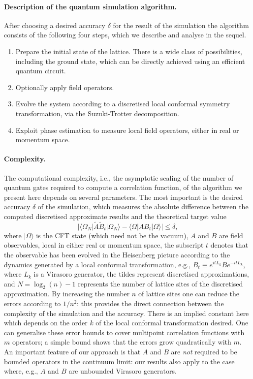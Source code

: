 \documentclass[12pt]{article}
\newcommand{\1}{\mathds{1}}
\begin{document}
\paragraph*{Description of the quantum simulation algorithm.}
After choosing a desired accuracy $\delta$ for the result of the simulation the algorithm consists of the following four steps, which we describe and analyse in the sequel.
\begin{enumerate}
  \item Prepare the initial state of the lattice. There is a wide class of possibilities, including the ground state, which can be directly achieved using an efficient quantum circuit.  
  \item Optionally apply field operators.
  \item Evolve the system according to a discretised local conformal symmetry transformation, via the Suzuki-Trotter decomposition.  
  \item Exploit phase estimation to measure local field operators, either in real or momentum space.
\end{enumerate}

\paragraph*{Complexity.}
The computational complexity, i.e., the asymptotic scaling of the number of quantum gates required to compute a correlation function, of the algorithm we present here depends on several parameters. The most important is the desired accuracy $\delta$ of the simulation, which measures the absolute difference between the computed discretised approximate results and the theoretical target value
\begin{equation*}
  |\langle \Omega_N|\widetilde{A} \widetilde{B}_t |\Omega_N\rangle - \langle \Omega|A B_t |\Omega\rangle| \le \delta,
\end{equation*}
where $|\Omega\rangle$ is the CFT state (which need not be the vacuum), $A$ and $B$ are field observables, local in either real or momentum space, the subscript $t$ denotes that the observable has been evolved in the Heisenberg picture according to the dynamics generated by a local conformal transformation, e.g., $B_t\equiv e^{it L_k} B e^{-it L_k}$, where $L_k$ is a Virasoro generator, the tildes represent discretised approximations, and $N = \log_{2}(n)-1$ represents the number of lattice sites of the discretised approximation. By increasing the number $n$ of lattice sites one can reduce the errors according to $1/n^{2}$: this provides the direct connection between the complexity of the simulation and the accuracy. There is an implied constant here which depends on the order $k$ of the local conformal transformation desired. One can generalise these error bounds to cover multipoint correlation functions with $m$ operators; a simple bound shows that the errors grow quadratically with $m$. An important feature of our approach is that $A$ and $B$ are \emph{not} required to be bounded operators in the continuum limit: our results also apply to the case where, e.g., $A$ and $B$ are unbounded Virasoro generators. 
\end{document}
